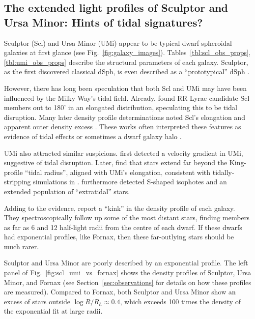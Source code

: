 \subsection{The extended light profiles of Sculptor and Ursa Minor:
Hints of tidal signatures?}\label{sec:scl_umi_obs_tides}

Sculptor (Scl) and Ursa Minor (UMi) appear to be typical dwarf
spheroidal galaxies at first glance (see Fig.~\ref{fig:galaxy_images}).
Tables~\ref{tbl:scl_obs_props}, \ref{tbl:umi_obs_props} describe the
structural parameters of each galaxy. Sculptor, as the first discovered
classical dSph, is even described as a ``prototypical'' dSph
\citep[e.g.,][]{mcconnachie2012}.

However, there has long been speculation that both Scl and UMi may have
been influenced by the Milky Way's tidal field. Already,
\citet{innanen+papp1979} found RR Lyrae candidate Scl members
\citep[from][]{vanagt1978} out to 180' in an elongated distribution,
speculating this to be tidal disruption. Many later density profile
determinations noted Scl's elongation and apparent outer density excess
\citetext{\citealp{eskridge1988}; \citealp{IH1995}; \citealp{walcher+2003}; \citealp{westfall+2006}; \citealp[but
see also][]{coleman+dacosta+bland-hawthorn2005}}. These works often
interpreted these features as evidence of tidal effects
\citep[e.g.,][]{walcher+2003} or sometimes a dwarf galaxy halo
\citep{westfall+2006}.

UMi also attracted similar suspicions. \citet{hargreaves+1994} first
detected a velocity gradient in UMi, suggestive of tidal disruption.
Later, \citet{martinez-delgado+2001} find that stars extend far beyond
the King-profile ``tidal radius'', aligned with UMi's elongation,
consistent with tidally-stripping simulations in
\citet{gomez-flechoso+martinez-delgado2003}. \citet{palma+2003}
furthermore detected S-shaped isophotes and an extended population of
``extratidal'' stars.

Adding to the evidence, \citet{sestito+2023a, sestito+2023b} report a
``kink'' in the density profile of each galaxy. They spectroscopically
follow up some of the most distant stars, finding members as far as 6
and 12 half-light radii from the centre of each dwarf. If these dwarfs
had exponential profiles, like Fornax, then these far-outlying stars
should be much rarer.

Sculptor and Ursa Minor are poorly described by an exponential profile.
The left panel of Fig.~\ref{fig:scl_umi_vs_fornax} shows the density
profiles of Sculptor, Ursa Minor, and Fornax (see
Section~\ref{sec:observations} for details on how these profiles are
measured). Compared to Fornax, both Sculptor and Ursa Minor show an
excess of stars outside \(\log R/R_h\approx 0.4\), which exceeds 100
times the density of the exponential fit at large radii.


